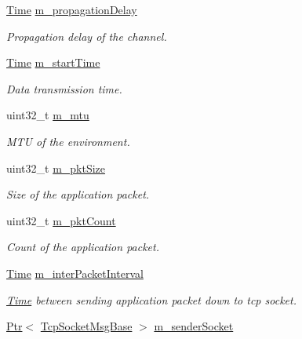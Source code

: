 \begin{DoxyCompactItemize}
\item 
\hyperlink{classns3_1_1Time}{Time} \hyperlink{classns3_1_1TcpGeneralTest_ac01c7d50468e3d4ab1156b43598ef286}{m\+\_\+propagation\+Delay}
\begin{DoxyCompactList}\small\item\em Propagation delay of the channel. \end{DoxyCompactList}\item 
\hyperlink{classns3_1_1Time}{Time} \hyperlink{classns3_1_1TcpGeneralTest_a9164d270007c08339775eb97ab644f0c}{m\+\_\+start\+Time}
\begin{DoxyCompactList}\small\item\em Data transmission time. \end{DoxyCompactList}\item 
uint32\+\_\+t \hyperlink{classns3_1_1TcpGeneralTest_a391718e29aac6692abf8ecfc5040e935}{m\+\_\+mtu}
\begin{DoxyCompactList}\small\item\em M\+TU of the environment. \end{DoxyCompactList}\item 
uint32\+\_\+t \hyperlink{classns3_1_1TcpGeneralTest_a4d3de84f15604ad31296fda0386968f4}{m\+\_\+pkt\+Size}
\begin{DoxyCompactList}\small\item\em Size of the application packet. \end{DoxyCompactList}\item 
uint32\+\_\+t \hyperlink{classns3_1_1TcpGeneralTest_a530b5d986e7da3f8fe7735cf2c2caf47}{m\+\_\+pkt\+Count}
\begin{DoxyCompactList}\small\item\em Count of the application packet. \end{DoxyCompactList}\item 
\hyperlink{classns3_1_1Time}{Time} \hyperlink{classns3_1_1TcpGeneralTest_a4c4f8fdf19afaec2c644f2162d19e6d4}{m\+\_\+inter\+Packet\+Interval}
\begin{DoxyCompactList}\small\item\em \hyperlink{classns3_1_1Time}{Time} between sending application packet down to tcp socket. \end{DoxyCompactList}\item 
\hyperlink{classns3_1_1Ptr}{Ptr}$<$ \hyperlink{classns3_1_1TcpSocketMsgBase}{Tcp\+Socket\+Msg\+Base} $>$ \hyperlink{classns3_1_1TcpGeneralTest_a929f7587e339d8a3cb9fbeac7c083636}{m\+\_\+sender\+Socket}

\end{DoxyCompactItemize}
